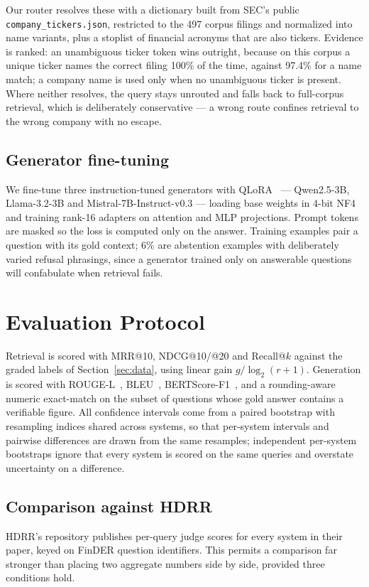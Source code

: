\documentclass[conference]{IEEEtran}
\begin{document}
Our router resolves these with a dictionary built from SEC's public
\texttt{company\_tickers.json}, restricted to the 497 corpus filings and
normalized into name variants, plus a stoplist of financial acronyms that are
also tickers. Evidence is ranked: an unambiguous ticker token wins outright,
because on this corpus a unique ticker names the correct filing 100\% of the
time, against 97.4\% for a name match; a company name is used only when no
unambiguous ticker is present. Where neither resolves, the query stays
unrouted and falls back to full-corpus retrieval, which is deliberately
conservative --- a wrong route confines retrieval to the wrong company with no
escape.

\subsection{Generator fine-tuning}
We fine-tune three instruction-tuned generators with QLoRA~\cite{dettmers2023qlora}
--- Qwen2.5-3B, Llama-3.2-3B and Mistral-7B-Instruct-v0.3 --- loading base
weights in 4-bit NF4 and training rank-16 adapters on attention and MLP
projections. Prompt tokens are masked so the loss is computed only on the
answer. Training examples pair a question with its gold context; 6\% are
abstention examples with deliberately varied refusal phrasings, since a
generator trained only on answerable questions will confabulate when retrieval
fails.

\section{Evaluation Protocol}
\label{sec:protocol}
Retrieval is scored with MRR@10, NDCG@10/@20 and Recall@$k$ against the graded
labels of Section~\ref{sec:data}, using linear gain $g/\log_2(r+1)$.
Generation is scored with ROUGE-L~\cite{lin2004rouge},
BLEU~\cite{papineni2002bleu}, BERTScore-F1~\cite{zhang2020bertscore}, and a
rounding-aware numeric exact-match on the subset of questions whose gold answer
contains a verifiable figure. All confidence intervals come from a paired
bootstrap with resampling indices shared across systems, so that per-system
intervals and pairwise differences are drawn from the same resamples;
independent per-system bootstraps ignore that every system is scored on the
same queries and overstate uncertainty on a difference.

\subsection{Comparison against HDRR}
\label{sec:protocol-hdrr}
HDRR's repository publishes per-query judge scores for every system in their
paper, keyed on FinDER question identifiers. This permits a comparison far
stronger than placing two aggregate numbers side by side, provided three
conditions hold.
\end{document}
